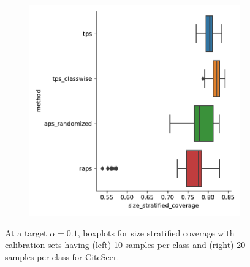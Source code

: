 \begin{figure}
\begin{subfigure}{0.48\linewidth}
        \includegraphics[width=\linewidth]{graphConformal/figures/nspc/citeseer_nspc_20_size_stratified_coverage}
    \end{subfigure}
    \caption{At a target $\alpha = 0.1$, boxplots for size stratified coverage with calibration sets having (left) 10 samples per class and (right) 20 samples per class for CiteSeer.}
    \label{fig:nspc:citeseer:ssc}
\end{figure}

